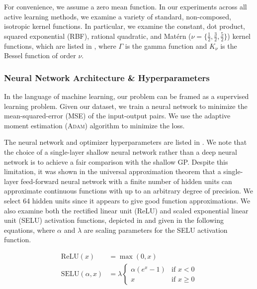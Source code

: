 \documentclass[conference]{IEEEtran}
\begin{document}
	For convenience, we assume a zero mean function. In our experiments across all active learning methods, we examine a variety of standard, non-composed, isotropic kernel functions. In particular, we examine the constant, dot product, squared exponential (RBF), rational quadratic, and Mat\'ern ($\nu = \{\tfrac{1}{2}, \tfrac{3}{2}, \tfrac{5}{2}\}$) kernel functions, which are listed in , where $\Gamma$ is the gamma function and $K_\nu$ is the Bessel function of order $\nu$. 
	
	\subsubsection{Neural Network Architecture \& Hyperparameters}
	
	In the language of machine learning, our problem can be framed as a supervised learning problem. Given our dataset, we train a neural network to minimize the mean-squared-error (MSE) of the input-output pairs. We use the adaptive moment estimation (\textsc{Adam}) algorithm to minimize the loss. 
	
	The neural network and optimizer hyperparameters are listed in . We note that the choice of a single-layer shallow neural network rather than a deep neural network is to achieve a fair comparison with the shallow GP. Despite this limitation, it was shown in the universal approximation theorem \cite{Cybenko1989ApproximationFunction} that a single-layer feed-forward neural network with a finite number of hidden units can approximate continuous functions with up to an arbitrary degree of precision. We select 64 hidden units since it appears to give good function approximations. We also examine both the rectified linear unit (ReLU) \cite{Nair2010RectifiedMachines} and scaled exponential linear unit (SELU) \cite{Klambauer2017Self-normalizingNetworks} activation functions, depicted in  and given in the following equations, where $\alpha$ and $\lambda$ are scaling parameters for the SELU activation function.
	
	\begin{align*}
	    \text{ReLU}(x) &= \max(0, x) \\
	    \text{SELU}(\alpha, x) &= \lambda 
	        \begin{cases}
                \alpha (e^x - 1) & \text{if $x < 0$} \\
                x & \text{if $x \ge 0$}
            \end{cases}   
	\end{align*}
	
\end{document}
